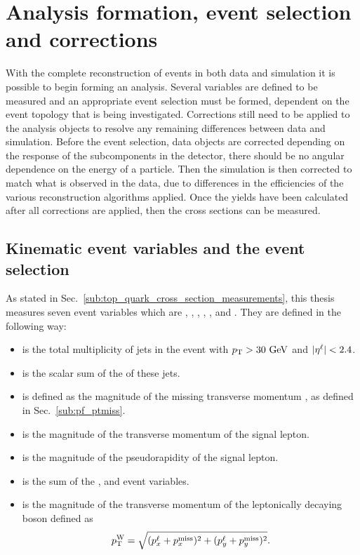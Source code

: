 \chapter{Analysis formation, event selection and corrections}
\label{ch:analysis}

With the complete reconstruction of events in both data and simulation it is possible to begin forming an analysis.
Several variables are defined to be measured and an appropriate event selection must be formed, dependent on the event topology that is being investigated.
Corrections still need to be applied to the analysis objects to resolve any remaining differences between data and simulation.
Before the event selection, data objects are corrected depending on the response of the subcomponents in the detector, \eg{} there should be no angular dependence on the energy of a particle.
Then the simulation is then corrected to match what is observed in the data, \eg{} due to differences in the efficiencies of the various reconstruction algorithms applied.
Once the \ttbar{} yields have been calculated after all corrections are applied, then the cross sections can be measured.

\section{Kinematic event variables and the event selection}
\label{sec:var}
As stated in Sec.~\ref{sub:top_quark_cross_section_measurements}, this thesis measures seven event variables which are \NJET{}, \HT{}, \ST{}, \ptmiss{}, \WPT{}, \LPT{} and \LETA{}.
They are defined in the following way:
\begin{itemize}
	\item \NJET{} is the total multiplicity of jets in the event with $p_{\mathrm{T}}>30\mathrm{~Ge\hspace{-.08em}V}^{}$ and $\lvert \eta^{\ell} \rvert<2.4$.
	\item \HT{} is the scalar sum of the \pt{} of these jets.
	\item \ptmiss{} is defined as the magnitude of the missing transverse momentum \ptmissvec{}, as defined in Sec.~\ref{sub:pf_ptmiss}.
	\item \LPT{} is the magnitude of the transverse momentum of the signal lepton.
	\item \LETA{} is the magnitude of the pseudorapidity of the signal lepton.
	\item \ST{} is the sum of the \HT{}, \LPT{} and \ptmiss{} event variables.
	\item {\WPT{} is the magnitude of the transverse momentum of the leptonically decaying boson defined as \\
	\begin{equation*}
		p_{\mathrm{T}}^{\mathrm{W}} = \sqrt{(p^{\ell}_{x}+p^{\mathrm{miss}}_{x})^2+(p^{\ell}_{y}+p^{\mathrm{miss}}_{y})^2}.
	\end{equation*}
}
\end{itemize}

